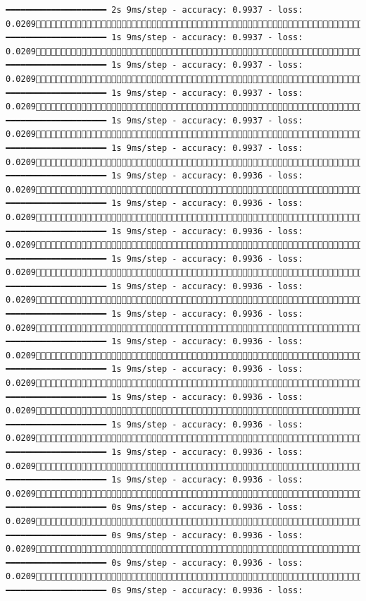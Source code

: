 \documentclass[
  letterpaper,
  DIV=11,
  numbers=noendperiod]{scrreprt}
\begin{document}
\begin{verbatim}
━━━━━━━━━━━━━━━━━━━━ 2s 9ms/step - accuracy: 0.9937 - loss: 0.02091650/1875 ━━━━━━━━━━━━━━━━━━━━ 1s 9ms/step - accuracy: 0.9937 - loss: 0.02091657/1875 ━━━━━━━━━━━━━━━━━━━━ 1s 9ms/step - accuracy: 0.9937 - loss: 0.02091664/1875 ━━━━━━━━━━━━━━━━━━━━ 1s 9ms/step - accuracy: 0.9937 - loss: 0.02091671/1875 ━━━━━━━━━━━━━━━━━━━━ 1s 9ms/step - accuracy: 0.9937 - loss: 0.02091678/1875 ━━━━━━━━━━━━━━━━━━━━ 1s 9ms/step - accuracy: 0.9937 - loss: 0.02091684/1875 ━━━━━━━━━━━━━━━━━━━━ 1s 9ms/step - accuracy: 0.9936 - loss: 0.02091691/1875 ━━━━━━━━━━━━━━━━━━━━ 1s 9ms/step - accuracy: 0.9936 - loss: 0.02091697/1875 ━━━━━━━━━━━━━━━━━━━━ 1s 9ms/step - accuracy: 0.9936 - loss: 0.02091704/1875 ━━━━━━━━━━━━━━━━━━━━ 1s 9ms/step - accuracy: 0.9936 - loss: 0.02091710/1875 ━━━━━━━━━━━━━━━━━━━━ 1s 9ms/step - accuracy: 0.9936 - loss: 0.02091716/1875 ━━━━━━━━━━━━━━━━━━━━ 1s 9ms/step - accuracy: 0.9936 - loss: 0.02091722/1875 ━━━━━━━━━━━━━━━━━━━━ 1s 9ms/step - accuracy: 0.9936 - loss: 0.02091728/1875 ━━━━━━━━━━━━━━━━━━━━ 1s 9ms/step - accuracy: 0.9936 - loss: 0.02091735/1875 ━━━━━━━━━━━━━━━━━━━━ 1s 9ms/step - accuracy: 0.9936 - loss: 0.02091741/1875 ━━━━━━━━━━━━━━━━━━━━ 1s 9ms/step - accuracy: 0.9936 - loss: 0.02091748/1875 ━━━━━━━━━━━━━━━━━━━━ 1s 9ms/step - accuracy: 0.9936 - loss: 0.02091754/1875 ━━━━━━━━━━━━━━━━━━━━ 1s 9ms/step - accuracy: 0.9936 - loss: 0.02091761/1875 ━━━━━━━━━━━━━━━━━━━━ 0s 9ms/step - accuracy: 0.9936 - loss: 0.02091768/1875 ━━━━━━━━━━━━━━━━━━━━ 0s 9ms/step - accuracy: 0.9936 - loss: 0.02091776/1875 ━━━━━━━━━━━━━━━━━━━━ 0s 9ms/step - accuracy: 0.9936 - loss: 0.02091783/1875 ━━━━━━━━━━━━━━━━━━━━ 0s 9ms/step - accuracy: 0.9936 - loss: 
\end{verbatim}
\end{document}

